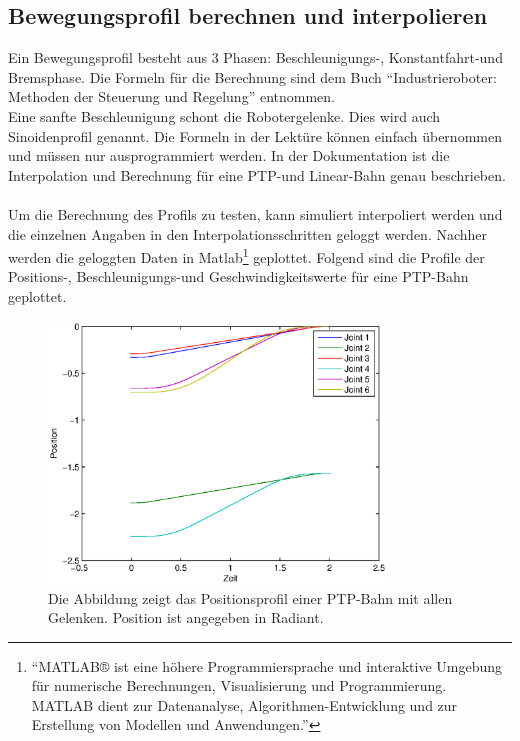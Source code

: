 \subsection{Bewegungsprofil berechnen und interpolieren}
\label{sub:profile_and_interpolation_rel}

Ein Bewegungsprofil besteht aus 3 Phasen: Beschleunigungs-, Konstantfahrt-und Bremsphase.
Die Formeln für die Berechnung sind dem Buch ``Industrieroboter: Methoden der Steuerung und Regelung'' \cite{WW-2013} entnommen.
\\
Eine sanfte Beschleunigung schont die Robotergelenke. Dies wird auch Sinoidenprofil genannt. Die Formeln in der Lektüre können einfach übernommen und müssen nur ausprogrammiert werden. In der Dokumentation ist die Interpolation und Berechnung für eine PTP-und Linear-Bahn
genau beschrieben.
\\\\
Um die Berechnung des Profils zu testen, kann simuliert interpoliert werden und die einzelnen Angaben in den Interpolationsschritten geloggt werden. Nachher werden die geloggten Daten in Matlab\footnote{``MATLAB® ist eine höhere Programmiersprache und interaktive Umgebung für numerische Berechnungen, Visualisierung und Programmierung. MATLAB dient zur Datenanalyse, Algorithmen-Entwicklung und zur Erstellung von Modellen und Anwendungen.''\cite{MATLAB-2014}} geplottet.
Folgend sind die Profile der Positions-, Beschleunigungs-und Geschwindigkeitswerte für eine PTP-Bahn geplottet.

\begin{figure}[H]
  \centering
    \includegraphics[width=0.8\textwidth]{pic/position_profile.eps}
      \caption[Positionsprofil einer PTP-Bahn in Matlab gepplotet]{Die Abbildung zeigt das Positionsprofil einer PTP-Bahn mit allen Gelenken. Position ist angegeben in Radiant.}
      \label{fig:position_ptp_profile}
\end{figure}

